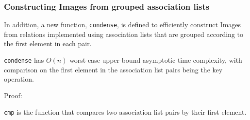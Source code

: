 \documentclass[../main.tex]{subfiles}
\begin{document}



\subsubsection{Constructing Images from grouped association lists}
In addition, a new function, \texttt{condense}, is defined to efficiently construct Images from relations implemented using association lists that are grouped according to the first element in each pair.


\begin{theorem}
	\texttt{condense} has $O(n)$ worst-case upper-bound asymptotic time complexity, with comparison on the first element in the association list pairs being the key operation.
\end{theorem}

Proof:

\texttt{cmp} is the function that compares two association list pairs by their first element.  






\end{document}
